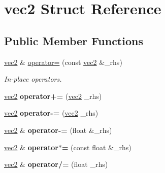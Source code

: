 \hypertarget{structvec2}{\section{vec2 Struct Reference}
\label{structvec2}
}
\subsection*{Public Member Functions}
\begin{DoxyCompactItemize}
\item 
\hypertarget{structvec2_ae310c09cba1a18e2ea5c2424efbd379a}{\hyperlink{structvec2}{vec2} \& \hyperlink{structvec2_ae310c09cba1a18e2ea5c2424efbd379a}{operator=} (const \hyperlink{structvec2}{vec2} \&\-\_\-rhs)}\label{structvec2_ae310c09cba1a18e2ea5c2424efbd379a}

\begin{DoxyCompactList}\small\item\em In-\/place operators. \end{DoxyCompactList}\item 
\hypertarget{structvec2_aac92973174fa2d083e85424bac285f7b}{\hyperlink{structvec2}{vec2} {\bfseries operator+=} (\hyperlink{structvec2}{vec2} \-\_\-rhs)}\label{structvec2_aac92973174fa2d083e85424bac285f7b}

\item 
\hypertarget{structvec2_a0d5c4f9c39c3447f1e63736002e65cd9}{\hyperlink{structvec2}{vec2} {\bfseries operator-\/=} (\hyperlink{structvec2}{vec2} \-\_\-rhs)}\label{structvec2_a0d5c4f9c39c3447f1e63736002e65cd9}

\item 
\hypertarget{structvec2_aa760a00db79c84afa878a11bb372fa0d}{\hyperlink{structvec2}{vec2} \& {\bfseries operator-\/=} (float \&\-\_\-rhs)}\label{structvec2_aa760a00db79c84afa878a11bb372fa0d}

\item 
\hypertarget{structvec2_ad355847bea03315da4200d08047d4b64}{\hyperlink{structvec2}{vec2} \& {\bfseries operator$\ast$=} (const float \&\-\_\-rhs)}\label{structvec2_ad355847bea03315da4200d08047d4b64}

\item 
\hypertarget{structvec2_a718a831cbe798ac6b9defc1ebd987525}{\hyperlink{structvec2}{vec2} \& {\bfseries operator/=} (float \-\_\-rhs)}\label{structvec2_a718a831cbe798ac6b9defc1ebd987525}

\end{DoxyCompactItemize}
